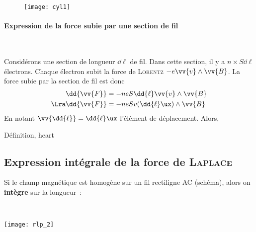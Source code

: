 \documentclass[../main/main.tex]{subfiles}
\begin{document}
\begin{figure}[h]
  \centering
  \texttt{[image: cyl1]}
  \label{fig:cyl1}
\end{figure}

\paragraph*{Expression de la force subie par une section de fil}~
\begin{hide}
  Considérons une section de longueur $\dd{\ell}$ de fil. Dans cette section, il y a
  $n\times S \dd{\ell}$ électrons. Chaque électron subit la force de
  \textsc{Lorentz} $-e \vv{v} \wedge \vv{B}$. La force subie par la section de fil
  est donc
  \begin{align*}
    \dd{\vv{F}} &= -neS \dd{\ell}\vv{v}\wedge \vv{B}
    \\\Lra 
    \dd{\vv{F}} &= -neSv (\dd{\ell}\ux)\wedge \vv{B}
  \end{align*}
  En notant $\vv{\dd{\ell}} = \dd{\ell}\ux$ l'élément de déplacement. Alors,
\end{hide}
\begin{tdefi}{Définition, heart}
\end{tdefi}

\subsection{Expression intégrale de la force de \textsc{Laplace}}
\label{ssec:lplint}
Si le champ magnétique est homogène sur un fil rectiligne AC (schéma), alors on
\textbf{intègre} sur la longueur~:
\smallbreak
\noindent
\begin{minipage}[t]{.5\linewidth}
\end{minipage}
\hfill
\begin{minipage}[t]{.5\linewidth}
  ~
  \begin{center}
    \texttt{[image: rlp\_2]}
    \label{fig:rlp_2}
  \end{center}
\end{minipage}
\end{document}
